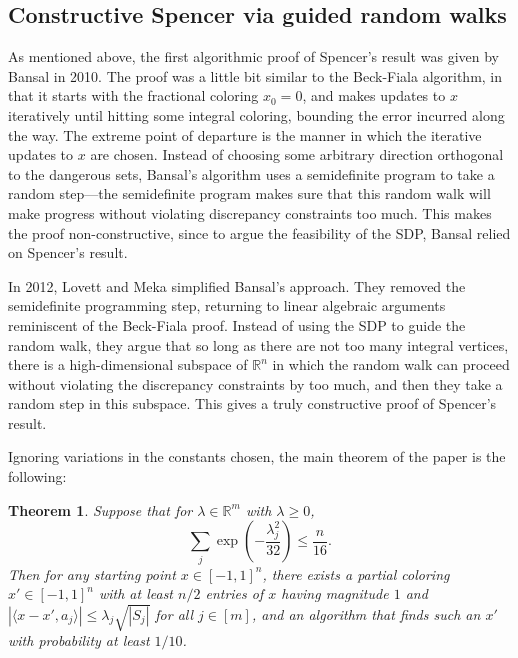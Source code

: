 \documentclass{article}
\theoremstyle{theorem}
\newtheorem{theorem}{Theorem}
\theoremstyle{definition}
\newcommand{\R}{\mathbb{R}}
\begin{document}
\subsection*{Constructive Spencer via guided random walks}

As mentioned above, the first algorithmic proof of Spencer's result was given by Bansal in 2010.
The proof was a little bit similar to the Beck-Fiala algorithm, in that it starts with the fractional coloring $x_0 = 0$, and makes updates to $x$ iteratively until hitting some integral coloring, bounding the error incurred along the way.
The extreme point of departure is the manner in which the iterative updates to $x$ are chosen.
Instead of choosing some arbitrary direction orthogonal to the dangerous sets, Bansal's algorithm uses a semidefinite program to take a random step---the semidefinite program makes sure that this random walk will make progress without violating discrepancy constraints too much.
This makes the proof non-constructive, since to argue the feasibility of the SDP, Bansal relied on Spencer's result.

In 2012, Lovett and Meka simplified Bansal's approach.
They removed the semidefinite programming step, returning to linear algebraic arguments reminiscent of the Beck-Fiala proof.
Instead of using the SDP to guide the random walk, they argue that so long as there are not too many integral vertices, there is a high-dimensional subspace of $\R^n$ in which the random walk can proceed without violating the discrepancy constraints by too much, and then they take a random step in this subspace.
This gives a truly constructive proof of Spencer's result.

Ignoring variations in the constants chosen, the main theorem of the paper is the following:
\begin{theorem}
Suppose that for $\lambda \in \R^m$ with $\lambda \ge 0$,
    \begin{equation}
	\sum_j \exp\left(-\frac{\lambda_j^2}{32}\right) \le \frac{n}{16}.\label{cond}
    \end{equation}
Then for any starting point $x \in [-1,1]^n$, there exists a partial coloring $x' \in [-1,1]^n$ with at least $n/2$ entries of $x$ having magnitude $1$ and $|\langle x - x', a_j\rangle | \le \lambda_j \sqrt{|S_j|}$ for all $j \in [m]$, and an algorithm that finds such an $x'$ with probability at least $1/10$.
\end{theorem}
\end{document}
